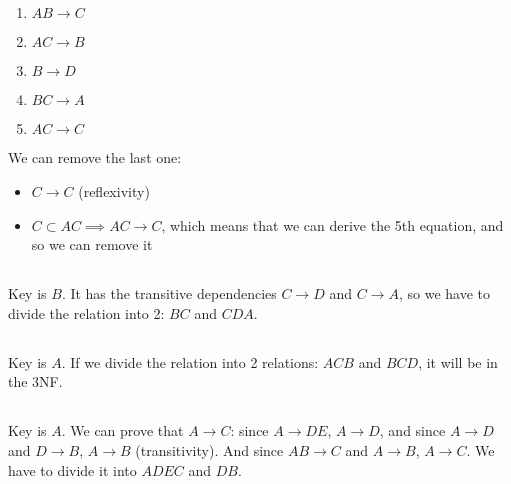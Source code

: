 \documentclass[a4paper]{article}
\begin{document}
\subsection{}
\begin{enumerate}
    \item $AB \to C$
    \item $AC \to B$
    \item $B \to D$
    \item $BC \to A$
    \item $AC \to C $
\end{enumerate}
We can remove the last one:
\begin{itemize}
    \item $C \to C$ (reflexivity)
    \item $C \subset AC \implies AC \to C$, which means that we can derive the 5th equation, and so we can remove it
\end{itemize}
\subsection{}
Key is $B$. It has the transitive dependencies $C \to D$ and $C \to A$, so we have to divide the relation into 2: $BC$ and $CDA$.
\subsection{}
Key is $A$. If we divide the relation into 2 relations: $ACB$ and $BCD$, it will be in the 3NF.%
\subsection{}
Key is $A$. We can prove that $A \to C$: since $A \to DE$, $A \to D$, and since $A \to D$ and $D \to B$, $A \to B$ (transitivity). And since $AB \to C$ and $A \to B$, $A \to C$. We have to divide it into $ADEC$ and $DB$.
\end{document}
